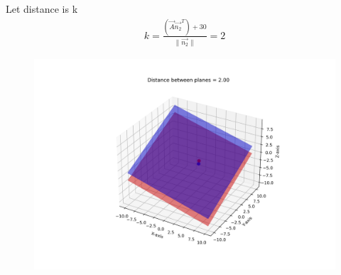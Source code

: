 \documentclass[journal]{IEEEtran}
\begin{document}
Let distance is k\\
\begin{align}
    k=\frac{(\vec{A}\vec{n_2}^T)+30}{\|\vec{n_2}\|}=2
\end{align}
\begin{figure}[h!]
    \centering
    \includegraphics[width=0.8\columnwidth]{figs/planes_distance.png}
    \caption{}
    \label{fig:placeholder}
\end{figure}
\end{document}
